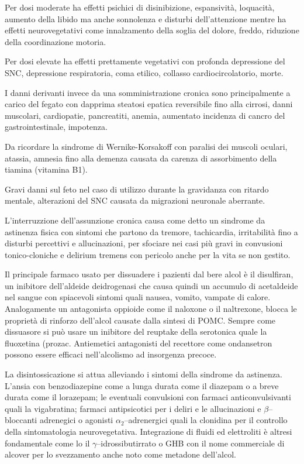 Per dosi moderate ha effetti psichici di disinibizione, espansività, loquacità, aumento della libido ma anche sonnolenza e disturbi dell'attenzione mentre ha effetti neurovegetativi come innalzamento della soglia del dolore, freddo, riduzione della coordinazione motoria.

Per dosi elevate ha effetti prettamente vegetativi con profonda depressione del SNC, depressione respiratoria, coma etilico, collasso cardiocircolatorio, morte.

I danni derivanti invece da una somministrazione cronica sono principalmente a carico del fegato con dapprima steatosi epatica reversibile fino alla cirrosi, danni muscolari, cardiopatie, pancreatiti, anemia, aumentato incidenza di cancro del gastrointestinale, impotenza.

Da ricordare la sindrome di Wernike-Korsakoff con paralisi dei muscoli oculari, atassia, amnesia fino alla demenza causata da carenza di assorbimento della tiamina (vitamina B1).

Gravi danni sul feto nel caso di utilizzo durante la gravidanza con ritardo mentale, alterazioni del SNC causata da migrazioni neuronale aberrante.

L'interruzzione dell'assunzione cronica causa come detto un sindrome da astinenza fisica con sintomi che partono da tremore, tachicardia, irritabilità fino a disturbi percettivi e allucinazioni, per sfociare nei casi più gravi in convusioni tonico-cloniche e delirium tremens con pericolo anche per la vita se non gestito.

Il principale farmaco usato per dissuadere i pazienti dal bere alcol è il disulfiran, un inibitore dell'aldeide deidrogenasi che causa quindi un accumulo di acetaldeide nel sangue con spiacevoli sintomi quali nausea, vomito, vampate di calore. Analogamente un antagonista oppioide come il naloxone o il naltrexone, blocca le proprietà di rinforzo dell'alcol causate dalla sintesi di POMC. Sempre come dissuasore si può usare un inibitore del reuptake della serotonica quale la fluoxetina (prozac. Antiemetici antagonisti del recettore  come ondansetron possono essere efficaci nell'alcolismo ad insorgenza precoce.

La disintossicazione si attua alleviando i sintomi della sindrome da astinenza. L'ansia con benzodiazepine come a lunga durata come il diazepam o a breve durata come il lorazepam; le eventuali convulsioni con farmaci anticonvulsivanti quali la vigabratina; farmaci antipsicotici per i deliri e le allucinazioni e $\beta$--bloccanti adrenegici o agonisti $\alpha_2$--adrenergici quali la clonidina per il controllo della sintomatologia neurovegetativa. Integrazione di fluidi ed elettroliti è altresi fondamentale come lo il $\gamma$--idrossibutirrato o GHB con il nome commerciale di alcover per lo svezzamento anche noto come metadone dell'alcol.

